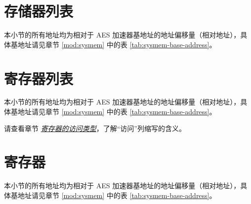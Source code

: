 \documentclass[main\_\_CN.tex]{subfiles}
\begin{document}
\clearpage
\section{存储器列表}

本小节的所有地址均为相对于 AES 加速器基地址的地址偏移量（相对地址），具体基地址请见章节 \ref{mod:sysmem} \textit{} 中的表 \ref{tab:sysmem-base-address}。



\clearpage
\section{寄存器列表}\hypertarget{aes-reg-summ}{}

本小节的所有地址均为相对于 AES 加速器基地址的地址偏移量（相对地址），具体基地址请见章节 \ref{mod:sysmem} \textit{} 中的表 \ref{tab:sysmem-base-address}。

请查看章节 \hyperref[glossary-access-types]{\textit{寄存器的访问类型}}，了解“访问”列缩写的含义。




\clearpage
\section{寄存器}

本小节的所有地址均为相对于 AES 加速器基地址的地址偏移量（相对地址），具体基地址请见章节 \ref{mod:sysmem} \textit{} 中的表 \ref{tab:sysmem-base-address}。


\end{document}
